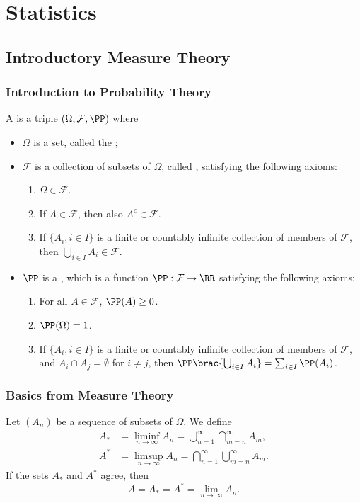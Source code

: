 \part{Statistics}
\chapter{Introductory Measure Theory}
\section{Introduction to Probability Theory}
\begin{definition}
A  is a triple $(\Omega,\mathcal{F},\PP)$ where
\begin{itemize}
\item $\Omega$ is a set, called the ;
\item $\mathcal{F}$ is a collection of subsets of $\Omega$, called , satisfying the following axioms:
\begin{enumerate}[label=F\arabic*:]
    \item $\Omega\in\mathcal{F}$.
    \item If $A\in\mathcal{F}$, then also $A^c\in\mathcal{F}$.
    \item If $\{A_i,i\in I\}$ is a finite or countably infinite collection of members of $\mathcal{F}$, then $\bigcup_{i\in I}A_i\in\mathcal{F}$.
\end{enumerate}
\item $\PP$ is a , which is a function $\PP:\mathcal{F}\to\RR$ satisfying the following axioms:
\begin{enumerate}[label=P\arabic*:]
    \item For all $A\in\mathcal{F}$, $\PP(A)\ge0$.
    \item $\PP(\Omega)=1$.
    \item If $\{A_i,i\in I\}$ is a finite or countably infinite collection of members of $\mathcal{F}$, and $A_i\cap A_j=\emptyset$ for $i\neq j$, then $\PP\brac{\bigcup_{i\in I}A_i}=\sum_{i\in I}\PP(A_i)$.
\end{enumerate}
\end{itemize}
\end{definition}

\section{Basics from Measure Theory}
\begin{definition}
Let $(A_n)$ be a sequence of subsets of $\Omega$. We define
\begin{align*}
A_*&=\liminf_{n\to\infty}A_n=\bigcup_{n=1}^{\infty}\bigcap_{m=n}^{\infty}A_m,\\
A^*&=\limsup_{n\to\infty}A_n=\bigcap_{n=1}^{\infty}\bigcup_{m=n}^{\infty}A_m.
\end{align*}
If the sets $A_*$ and $A^*$ agree, then
\[A=A_*=A^*=\lim_{n\to\infty}A_n.\]
\end{definition}

